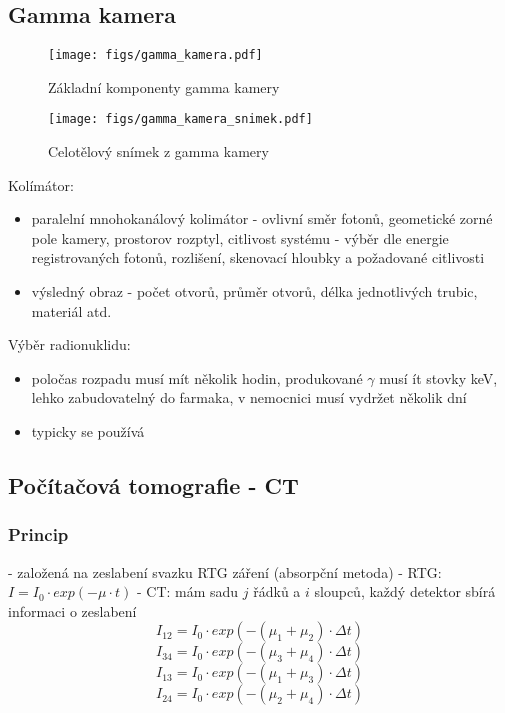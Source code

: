 \subsection{Gamma kamera}

\begin{figure}[ht!]
    \centering
    \texttt{[image: figs/gamma\_kamera.pdf]}
    \caption{Základní komponenty gamma kamery}
    \label{fig:2_5_gamma_kamera}
\end{figure}

\begin{figure}[ht!]
    \centering
    \texttt{[image: figs/gamma\_kamera\_snimek.pdf]}
    \caption{Celotělový snímek z gamma kamery}
    \label{fig:5_2_gamma_kamera_snimek}
\end{figure}
Kolímátor: 
\begin{itemize}
    \item paralelní mnohokanálový kolimátor - ovlivní směr fotonů, geometické zorné pole kamery, prostorov rozptyl, citlivost systému - výběr dle energie registrovaných fotonů, rozlišení, skenovací hloubky a požadované citlivosti
    \item výsledný obraz - počet otvorů, průměr otvorů, délka jednotlivých trubic, materiál atd.
\end{itemize}
Výběr radionuklidu:
\begin{itemize}
    \item poločas rozpadu musí mít několik hodin, produkované $\gamma$ musí ít stovky keV, lehko zabudovatelný do farmaka, v nemocnici musí vydržet několik dní
    \item typicky se používá 
\end{itemize}


\subsection{Počítačová tomografie - CT}
\subsubsection{Princip}
- založená na zeslabení svazku RTG záření (absorpční metoda)
- RTG: $I = I_0 \cdot exp(-\mu\cdot t)$
- CT: mám sadu $j$ řádků a $i$ sloupců, každý detektor sbírá informaci o zeslabení
$$I_{12} = I_{0} \cdot exp(-(\mu_{1} + \mu_{2})\cdot \Delta t)$$
$$I_{34} = I_{0} \cdot exp(-(\mu_{3} + \mu_{4})\cdot \Delta t)$$
$$I_{13} = I_{0} \cdot exp(-(\mu_{1} + \mu_{3})\cdot \Delta t)$$
$$I_{24} = I_{0} \cdot exp(-(\mu_{2} + \mu_{4})\cdot \Delta t)$$

